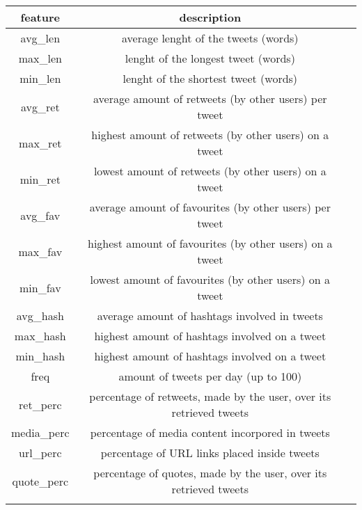 \small
\begin{center}
	\begin{tabular}{ccc}
		\\feature&description\\
		\hline\hline
		avg\_len&average lenght of the tweets (words)\\
		max\_len&lenght of the longest tweet (words)\\
		min\_len&lenght of the shortest tweet (words)\\
		avg\_ret&average amount of retweets (by other users) per tweet\\
		max\_ret&highest amount of retweets (by other users) on a tweet\\
		min\_ret&lowest amount of retweets (by other users) on a tweet\\
		avg\_fav&average amount of favourites (by other users) per tweet\\
		max\_fav&highest amount of favourites (by other users) on a tweet\\
		min\_fav&lowest amount of favourites (by other users) on a tweet\\
		avg\_hash&average amount of hashtags involved in tweets\\
		max\_hash&highest amount of hashtags involved on a tweet\\
		min\_hash&highest amount of hashtags involved on a tweet\\
		freq&amount of tweets per day (up to 100)\\
		ret\_perc&percentage of retweets, made by the user, over its retrieved tweets\\
		media\_perc&percentage of media content incorpored in tweets\\
		url\_perc&percentage of URL links placed inside tweets\\
		quote\_perc&percentage of quotes, made by the user, over its retrieved tweets\\\hline\\
	\end{tabular}
\end{center}
\normalsize

